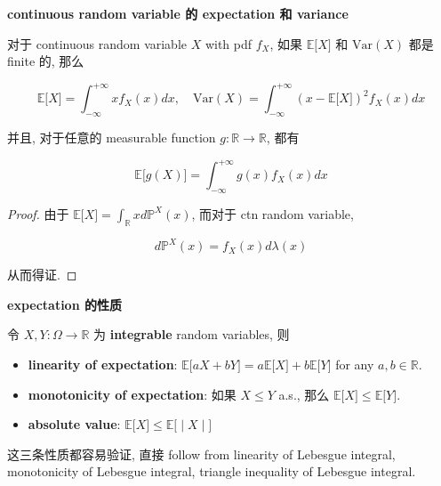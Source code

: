 \documentclass{qlnotes-export}
\begin{document}
\begin{proposition}{\protect{}\label{kn-continuous-random-variable-expectation-variance}{\textbf{continuous
random variable 的 expectation 和 variance}}}

对于 continuous random variable \(X\) with pdf \(f_{X}\), 如果 \({\mathbb{E}}\lbrack X\rbrack\) 和 \(\text{Var}(X)\) 都是 finite 的, 那么

\[{\mathbb{E}}\lbrack X\rbrack = \int_{- \infty}^{+ \infty}xf_{X}(x) dx,\quad\text{Var}(X) = \int_{- \infty}^{+ \infty}(x - {\mathbb{E}}\lbrack X\rbrack)^{2}f_{X}(x) dx\]

并且, 对于任意的 measurable function \(g:{\mathbb{R}}\rightarrow{\mathbb{R}}\), 都有

\[{\mathbb{E}}\lbrack g(X)\rbrack = \int_{- \infty}^{+ \infty}g(x)f_{X}(x) dx\]

\end{proposition}

\begin{proof}

由于 \({\mathbb{E}}\lbrack X\rbrack = \int_{\mathbb{R}}x d{\mathbb{P}}^{X}(x)\), 而对于 ctn random variable,

\[d{\mathbb{P}}^{X}(x) = f_{X}(x) d\lambda(x)\]

从而得证.

\end{proof}

\begin{proposition}{\protect{}\label{kn-expectation}{\textbf{expectation
的性质}}}

令 \(X,Y:\Omega\rightarrow{\mathbb{R}}\) 为 \textbf{integrable} random variables, 则

\begin{itemize}
\item
  \textbf{linearity of expectation}: \({\mathbb{E}}\lbrack aX + bY\rbrack = a{\mathbb{E}}\lbrack X\rbrack + b{\mathbb{E}}\lbrack Y\rbrack\) for any \(a,b \in {\mathbb{R}}\).
\item
  \textbf{monotonicity of expectation}: 如果 \(X \leq Y\) a.s., 那么 \({\mathbb{E}}\lbrack X\rbrack \leq {\mathbb{E}}\lbrack Y\rbrack\).
\item
  \textbf{absolute value}: \(\left. {\mathbb{E}}\lbrack X\rbrack \leq {\mathbb{E}}\lbrack \middle| X \middle| \rbrack \right.\)
\end{itemize}

\end{proposition}

这三条性质都容易验证, 直接 follow from linearity of Lebesgue integral, monotonicity of Lebesgue integral, triangle inequality of Lebesgue integral.
\end{document}
